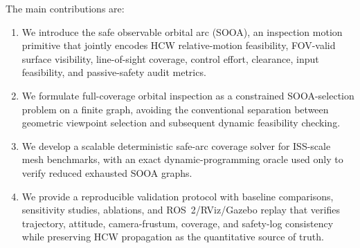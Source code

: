 The main contributions are:
\begin{enumerate}
  \item We introduce the safe observable orbital arc (SOOA), an inspection
  motion primitive that jointly encodes HCW relative-motion feasibility,
  FOV-valid surface visibility, line-of-sight coverage, control effort,
  clearance, input feasibility, and passive-safety audit metrics.
  \item We formulate full-coverage orbital inspection as a constrained
  SOOA-selection problem on a finite graph, avoiding the conventional
  separation between geometric viewpoint selection and subsequent dynamic
  feasibility checking.
  \item We develop a scalable deterministic safe-arc coverage solver for
  ISS-scale mesh benchmarks, with an exact dynamic-programming oracle used
  only to verify reduced exhausted SOOA graphs.
  \item We provide a reproducible validation protocol with baseline
  comparisons, sensitivity studies, ablations, and ROS~2/RViz/Gazebo replay
  that verifies trajectory, attitude, camera-frustum, coverage, and safety-log
  consistency while preserving HCW propagation as the quantitative source of
  truth.
\end{enumerate}
